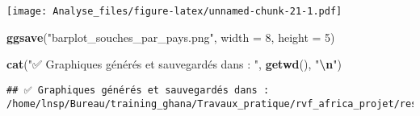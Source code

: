 \documentclass[
]{article}
\newenvironment{Shaded}{\begin{snugshade}}{\end{snugshade}}
\newcommand{\AttributeTok}[1]{\textcolor[rgb]{0.13,0.29,0.53}{#1}}
\newcommand{\DecValTok}[1]{\textcolor[rgb]{0.00,0.00,0.81}{#1}}
\newcommand{\FunctionTok}[1]{\textcolor[rgb]{0.13,0.29,0.53}{\textbf{#1}}}
\newcommand{\NormalTok}[1]{#1}
\newcommand{\SpecialCharTok}[1]{\textcolor[rgb]{0.81,0.36,0.00}{\textbf{#1}}}
\newcommand{\StringTok}[1]{\textcolor[rgb]{0.31,0.60,0.02}{#1}}
\begin{document}
\texttt{[image: Analyse\_files/figure-latex/unnamed-chunk-21-1.pdf]}

\begin{Shaded}
\begin{Highlighting}[]
\FunctionTok{ggsave}\NormalTok{(}\StringTok{"barplot\_souches\_par\_pays.png"}\NormalTok{, }\AttributeTok{width =} \DecValTok{8}\NormalTok{, }\AttributeTok{height =} \DecValTok{5}\NormalTok{)}

\FunctionTok{cat}\NormalTok{(}\StringTok{"✅ Graphiques générés et sauvegardés dans : "}\NormalTok{, }\FunctionTok{getwd}\NormalTok{(), }\StringTok{"}\SpecialCharTok{\textbackslash{}n}\StringTok{"}\NormalTok{)}
\end{Highlighting}
\end{Shaded}

\begin{verbatim}
## ✅ Graphiques générés et sauvegardés dans :  /home/lnsp/Bureau/training_ghana/Travaux_pratique/rvf_africa_projet/resultats
\end{verbatim}
\end{document}
